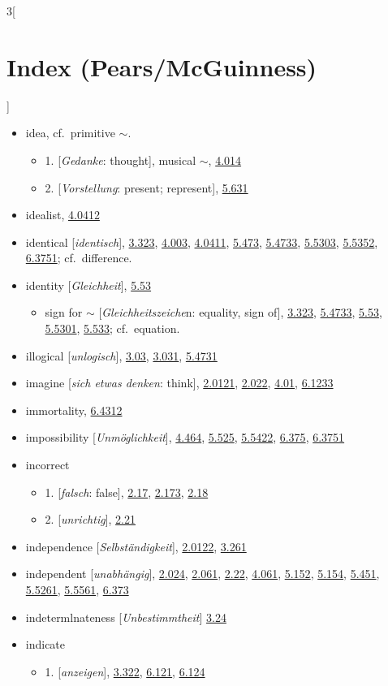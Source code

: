 \documentclass[oneside,openany,12pt]{book}
\newcommand{\indexentry}[1]{\item #1}
\newcommand{\indexsubentry}[1]{\begin{itemize} \item #1 \end{itemize}}
\newcommand{\indexref}[1]{\hyperlink{prop#1}{#1}}
\newcommand{\indexgap}{\bigskip}
\begin{document}
\begin{multicols}{3}[\section*{Index (Pears/McGuinness)}]
\begin{itemize}
\indexgap

\indexentry{idea, cf.\ primitive $\sim$.}

   \indexsubentry{1. [\textit{Gedanke}: thought], musical $\sim$, \indexref{4.014}}

   \indexsubentry{2. [\textit{Vorstellung}: present; represent], \indexref{5.631}}

\indexentry{idealist, \indexref{4.0412}}

\indexentry{identical [\textit{identisch}], \indexref{3.323}, \indexref{4.003}, \indexref{4.0411}, \indexref{5.473}, \indexref{5.4733}, \indexref{5.5303}, \indexref{5.5352}, \indexref{6.3751}; cf.\ difference.}

\indexentry{identity [\textit{Gleichheit}], \indexref{5.53}}

   \indexsubentry{sign for $\sim$ [\textit{Gleichheitszeiche}n: equality, sign of], \indexref{3.323}, \indexref{5.4733}, \indexref{5.53}, \indexref{5.5301}, \indexref{5.533}; cf.\ equation.}

\indexentry{illogical [\textit{unlogisch}], \indexref{3.03}, \indexref{3.031}, \indexref{5.4731}}

\indexentry{imagine [\textit{sich etwas denken}: think], \indexref{2.0121}, \indexref{2.022}, \indexref{4.01}, \indexref{6.1233}}

\indexentry{immortality, \indexref{6.4312}}

\indexentry{impossibility [\textit{Unm{\"o}glichkeit}], \indexref{4.464}, \indexref{5.525}, \indexref{5.5422}, \indexref{6.375}, \indexref{6.3751}}

\indexentry{incorrect}

   \indexsubentry{1. [\textit{falsch}: false], \indexref{2.17}, \indexref{2.173}, \indexref{2.18}}

   \indexsubentry{2. [\textit{unrichtig}], \indexref{2.21}}

\indexentry{independence [\textit{Selbst{\"a}ndigkeit}], \indexref{2.0122}, \indexref{3.261}}

\indexentry{independent [\textit{unabh{\"a}ngig}], \indexref{2.024}, \indexref{2.061}, \indexref{2.22}, \indexref{4.061}, \indexref{5.152}, \indexref{5.154}, \indexref{5.451}, \indexref{5.5261}, \indexref{5.5561}, \indexref{6.373}}

\indexentry{indetermlnateness [\textit{Unbestimmtheit}] \indexref{3.24}}

\indexentry{indicate}

   \indexsubentry{1. [\textit{anzeigen}], \indexref{3.322}, \indexref{6.121}, \indexref{6.124}}


\end{itemize}
\end{multicols}
\end{document}
